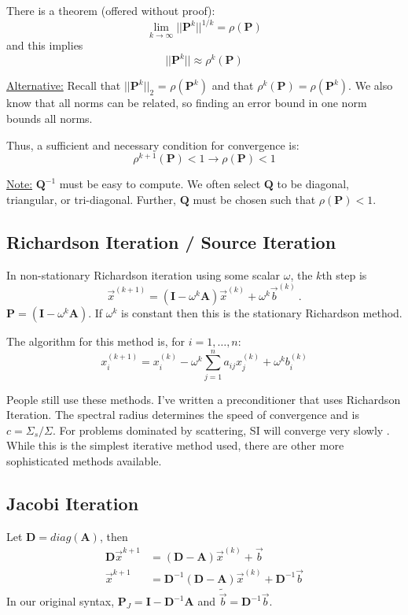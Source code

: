 \documentclass[12pt]{article}
\newcommand{\ve}[1]{\ensuremath{\mathbf{#1}}}
\begin{document}
There is a theorem (offered without proof):
\[\lim_{k \rightarrow \infty} || \ve{P}^k ||^{1/k} = \rho	(\ve{P})\]
and this implies
\[|| \ve{P}^k || \approx \rho^k (\ve{P})\]

\underline{Alternative:} Recall that $|| \ve{P}^k ||_2$ = $\rho(\ve{P}^k)$ and that $ \rho^k (\ve{P}) = \rho(\ve{P}^k)$. We also know that all norms can be related, so finding an error bound in one norm bounds all norms. 

Thus, a sufficient and necessary condition for convergence is:
\[\rho^{k+1}(\ve{P}) < 1 \rightarrow \rho(\ve{P}) < 1 \]

\underline{Note:} $\ve{Q}^{-1}$ must be easy to compute. We often select $\ve{Q}$ to be diagonal, triangular, or tri-diagonal. Further, $\ve{Q}$ must be chosen such that $\rho(\ve{P}) < 1$.

\subsection{Richardson Iteration / Source Iteration}

In non-stationary Richardson iteration using some scalar $\omega$, the $k$th step is
%
\begin{equation}
  \vec{x}^{(k+1)} = (\ve{I} - \omega^{k}\ve{A})\vec{x}^{(k)} + \omega^{k}\vec{b}^{(k)} \:. \nonumber
\end{equation}
%
$\ve{P} = (\ve{I} - \omega^{k}\ve{A})$. If $\omega^{k}$ is constant then this is the stationary Richardson method. 

The algorithm for this method is, for $i = 1, \dots, n$:
\[ x^{(k+1)}_i =  x^{(k)}_i - \omega^{k} \sum_{j=1}^{n} a_{ij}x_j^{(k)} + \omega^{k} b_i^{(k)} \]

People still use these methods. I've written a preconditioner that uses Richardson Iteration. The spectral radius determines the speed of convergence and is $c = \Sigma_s / \Sigma$. For problems dominated by scattering, SI will converge very slowly \cite{Evans2009d}. While this is the simplest iterative method used, there are other more sophisticated methods available. 

\subsection{Jacobi Iteration}

Let $\ve{D} = diag(\ve{A})$, then
\begin{align}
\ve{D} \vec{x}^{k+1} &= (\ve{D} - \ve{A})\vec{x}^{(k)} + \vec{b} \nonumber \\
%
\vec{x}^{k+1} &= \ve{D}^{-1}(\ve{D} - \ve{A})\vec{x}^{(k)} + \ve{D}^{-1}\vec{b} \nonumber
\end{align}
%
In our original syntax, $\ve{P}_J = \ve{I} -  \ve{D}^{-1}\ve{A}$ and $\tilde{\vec{b}} =\ve{D}^{-1}\vec{b}$.
\end{document}
